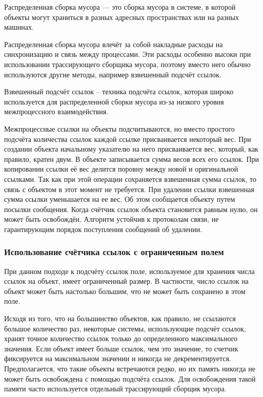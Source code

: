 Распределенная сборка мусора \cite{glossary} --- это сборка мусора в системе, в которой объекты могут храниться в разных адресных пространствах или на разных машинах. 

Распределенная сборка мусора влечёт за собой накладные расходы на синхронизацию и связь между процессами. Эти расходы особенно высоки при использовании трассирующего сборщика мусора, поэтому вместо него обычно используются другие методы, например взвешенный подсчёт ссылок. \cite{glossary}

Взвешенный подсчёт ссылок \cite{glossary} -- техника подсчёта ссылок, которая широко используется для распределенной сборки мусора из-за низкого уровня межпроцессного взаимодействия.

Межпроцессные ссылки на объекты подсчитываются, но вместо простого подсчёта количества ссылок каждой ссылке присваивается некоторый вес. При создании объекта начальному указателю на него присваивается вес, который, как правило, кратен двум. В объекте записывается сумма весов всех его ссылок. При копировании ссылки её вес делится поровну между новой и оригинальной ссылками. Так как при этой операции сохраняется взвешенная сумма ссылок, то связь с объектом в этот момент не требуется. При удалении ссылки взвешенная сумма ссылки уменьшается на ее вес. Об этом сообщается объекту путем посылки сообщения. Когда счётчик ссылок объекта становится равным нулю, он может быть освобождён. Алгоритм устойчив к протоколам связи, не гарантирующим порядок поступления сообщений об удалении. \cite{glossary}

\subsubsection{Использование счётчика ссылок с ограниченным полем}

При данном подходе к подсчёту ссылок поле, используемое для хранения числа ссылок на объект, имеет ограниченный размер. В частности, число ссылок на объект может быть настолько большим, что не может быть сохранено в этом поле. \cite{glossary}

Исходя из того, что на большинство объектов, как правило, не ссылаются большое количество раз, некоторые системы, использующие подсчёт ссылок, хранят точное количество ссылок только до определенного максимального значения. Если объект имеет больше ссылок, чем это значение, то счетчик фиксируется на максимальном значении и никогда не декрементируется. Предполагается, что такие объекты встречаются редко, но их память никогда не может быть освобождена с помощью подсчёта ссылок. Для освобождения такой памяти часто используется отдельный трассирующий сборщик мусора. \cite{glossary}

